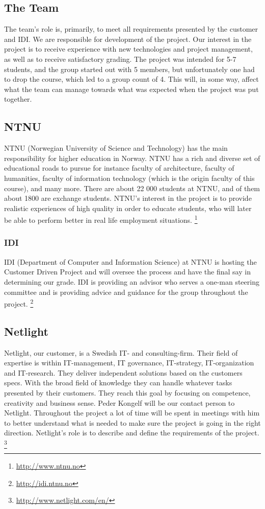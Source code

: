 \subsection{The Team}
The team's role is, primarily, to meet all requirements presented by the customer and IDI. We are responsible for development of the project. Our interest in the project is to receive experience with new technologies and project management, as well as to receive satisfactory grading.
The project was intended for 5-7 students, and the group started out with 5 members, but unfortunately one had to drop the course, which led to a group count of 4. This will, in some way, affect what the team can manage towards what was expected when the project was put together.

\subsection{NTNU}
\label{NTNU}
NTNU (Norwegian University of Science and Technology) has the main responsibility for higher education in Norway. NTNU has a rich and diverse set of educational roads to pursue for instance faculty of architecture, faculty of humanities, faculty of information technology (which is the origin faculty of this course), and many more. There are about 22 000 students at NTNU, and of them about 1800 are exchange students. NTNU’s interest in the project is to provide realistic experiences of high quality in order to educate students, who will later be able to perform better in real life employment situations.
\footnote{\url{http://www.ntnu.no}}

\subsubsection{IDI}
IDI (Department of Computer and Information Science) at NTNU is hosting the Customer Driven Project and will oversee the process and have the final say in determining our grade. IDI is providing an advisor who serves a one-man steering committee and is providing advice and guidance for the group throughout the project.
\footnote{\url{http://idi.ntnu.no}}

\subsection{Netlight}
Netlight, our customer, is a Swedish IT- and consulting-firm. Their field of expertise is within IT-management, IT governance, IT-strategy, IT-organization and IT-research. They deliver independent solutions based on the customers specs. With the broad field of knowledge they can handle whatever tasks presented by their customers. They reach this goal by focusing on competence, creativity and business sense. 
Peder Kongelf will be our contact person to Netlight. Throughout the project a lot of time will be spent in meetings with him to better understand what is needed to make sure the project is going in the right direction. Netlight's role is to describe and define the requirements of the project.
\footnote{\url{http://www.netlight.com/en/}}

